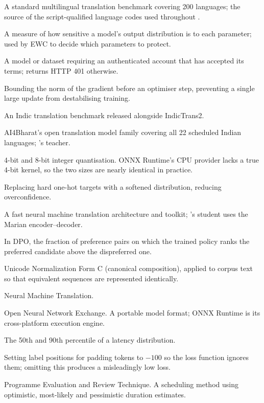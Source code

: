 {\begin{terms}
\item[FLORES-200] A standard multilingual translation benchmark covering 200 languages; the source of the script-qualified language codes used throughout \setu{}.
\item[Fisher information] A measure of how sensitive a model's output distribution is to each parameter; used by EWC to decide which parameters to protect.
\item[Gated (Hugging Face)] A model or dataset requiring an authenticated account that has accepted its terms; returns HTTP 401 otherwise.
\item[Gradient clipping] Bounding the norm of the gradient before an optimiser step, preventing a single large update from destabilising training.
\item[IN22] An Indic translation benchmark released alongside IndicTrans2.
\item[IndicTrans2] AI4Bharat's open translation model family covering all 22 scheduled Indian languages; \setu{}'s teacher.
\item[INT4 / INT8] 4-bit and 8-bit integer quantisation. ONNX Runtime's CPU provider lacks a true 4-bit kernel, so the two sizes are nearly identical in practice.
\item[Label smoothing] Replacing hard one-hot targets with a softened distribution, reducing overconfidence.
\item[Marian] A fast neural machine translation architecture and toolkit; \setu{}'s student uses the Marian encoder--decoder.
\item[Margin accuracy] In DPO, the fraction of preference pairs on which the trained policy ranks the preferred candidate above the dispreferred one.
\item[NFC] Unicode Normalization Form C (canonical composition), applied to corpus text so that equivalent sequences are represented identically.
\item[NMT] Neural Machine Translation.
\item[ONNX] Open Neural Network Exchange. A portable model format; ONNX Runtime is its cross-platform execution engine.
\item[p50 / p90] The 50th and 90th percentile of a latency distribution.
\item[PAD masking] Setting label positions for padding tokens to $-100$ so the loss function ignores them; omitting this produces a misleadingly low loss.
\item[PERT] Programme Evaluation and Review Technique. A scheduling method using optimistic, most-likely and pessimistic duration estimates.

\end{terms}}
